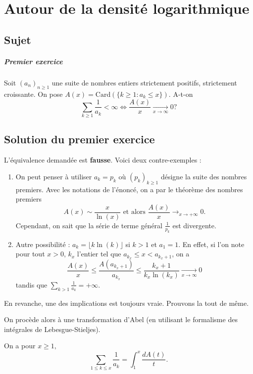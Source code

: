 \chapter{Autour de la densité logarithmique}

\section{Sujet}

\paragraph{Premier exercice}
Soit $(a_n)_{n\geqslant1}$ une suite de nombres entiers strictement positifs, strictement croissante. On pose $A(x) = \mathrm{Card}(\{k \geqslant 1 : a_{k} \leqslant  x\})$. A-t-on \[\sum _{k\geqslant1} \frac{1}{a_{k}} <\infty  \iff  \frac{A(x)}{x} \xrightarrow[x\rightarrow \infty ]{} 0 ?\]

\section{Solution du premier exercice}

L'équivalence demandée est \textbf{fausse}. Voici deux contre-exemples :
\begin{enumerate}
    \item On peut penser à utiliser $a_{k}=p_{k}$ où $\displaystyle (p_{k})_{k\geq 1}$ désigne la suite des nombres premiers. Avec les notations de l'énoncé, on a par le théorème des nombres premiers $$A(x)\sim \frac{x}{\ln(x)} \mbox{ et alors } \frac{A(x)}{x}\longrightarrow_{x\rightarrow +\infty} 0.$$
    Cependant, on sait que la série de terme général $\displaystyle \frac{1}{p_{k}}$ est divergente.
    \item Autre possibilité : $a_k = \lfloor k \ln(k)\rfloor$ si $k>1$ et $a_1=1$. En effet, si l'on note pour tout $x>0$, $k_x$ l'entier tel que $a_{k_x}\leqslant x <a_{k_x+1}$, on a \[\frac{A(x)}{x} \leqslant \frac{A(a_{k_x+1})}{a_{k_x}} \leqslant \frac{k_x+1}{k_x\ln(k_x)} \xrightarrow[x\rightarrow \infty ]{} 0\]
    tandis que $\displaystyle \sum_{k>1} \frac1{a_k} =+\infty$.
\end{enumerate}

En revanche, une des implications est toujours vraie. Prouvons la tout de même.

On procède alors à une transformation d'Abel (en utilisant le formalisme des intégrales de Lebesgue-Stieljes).

On a pour $x\geq 1,$
$$\sum_{1\leq k\leq x}\frac{1}{a_{k}} = \int_{1}^{x}\frac{dA(t)}{t}.$$

